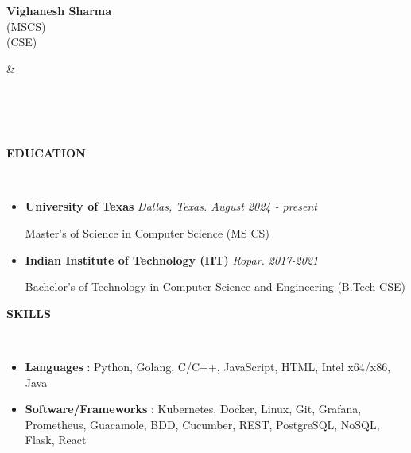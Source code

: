 \documentclass[a4paper,10pt]{article}
\newcommand{\lsep}{-0.6cm}
\newcommand{\resheading}[1]{{\small \colorbox{mygrey}{\begin{minipage}{0.975\textwidth}{\textbf{#1 \vphantom{p\^{E}}}}\end{minipage}}}}
\begin{document}

\begin{minipage}{0.5\linewidth}
\textbf{\Large Vighanesh Sharma}\\
 (MSCS)\\
 (CSE)\\
\end{minipage}
&\hspace{2.5cm}
\begin{minipage}{0.5\linewidth}
\\
\\
 \\
\end{minipage}

\resheading{\textbf{EDUCATION} }\\[\lsep]
\vspace{1.0pt}
\begin{itemize}
\item \textbf{University of Texas} \hfill \emph{Dallas, Texas. August 2024 - present}
\setlength{\itemsep}{1pt}
\setlength{\parskip}{0pt}
\setlength{\parsep}{0pt}

Master's of Science in Computer Science (MS CS)

\item \textbf{Indian Institute of Technology (IIT)} \hfill \emph{Ropar. 2017-2021}
\setlength{\itemsep}{1pt}
\setlength{\parskip}{0pt}
\setlength{\parsep}{0pt}

Bachelor's of Technology in Computer Science and Engineering (B.Tech CSE)

\end{itemize}

\resheading{\textbf{SKILLS} }\\[\lsep]
\vspace{1.0pt}
\begin{itemize}[itemsep=0.1pt]

\item \noindent \textbf{Languages} : Python, Golang, C/C++, JavaScript, HTML, Intel x64/x86, Java
\item \noindent \textbf{Software/Frameworks} : Kubernetes, Docker, Linux, Git, Grafana, Prometheus, Guacamole, BDD, Cucumber, REST, PostgreSQL, NoSQL, Flask, React
\end{itemize}
\end{document}
